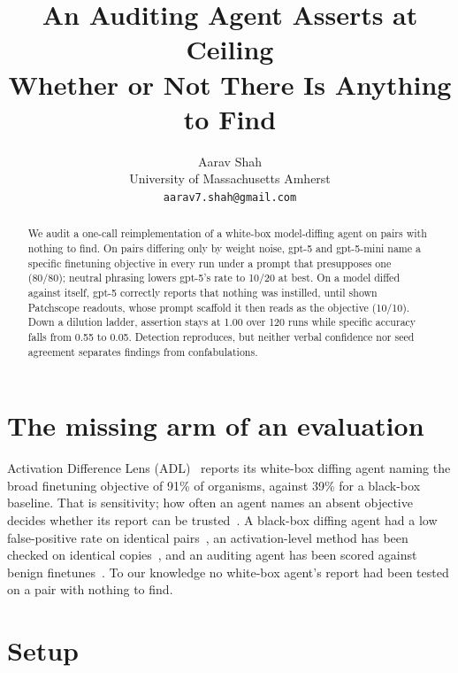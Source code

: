 \documentclass{article}
\title{\bfseries An Auditing Agent Asserts at Ceiling\\
Whether or Not There Is Anything to Find}
\author{Aarav Shah\\University of Massachusetts Amherst\\\texttt{aarav7.shah@gmail.com}}
\date{}
\begin{document}
\maketitle
\suppressfloats[t]
\vspace{-2.1em}

\begin{abstract}
\small\noindent
We audit a one-call reimplementation of a white-box model-diffing agent on pairs
with nothing to find. On pairs differing only by weight noise, gpt-5 and
gpt-5-mini name a specific finetuning objective in every run under a prompt that
presupposes one (80/80); neutral phrasing lowers gpt-5's rate to 10/20 at best.
On a model diffed against itself, gpt-5 correctly reports that nothing was
instilled, until shown Patchscope readouts, whose prompt scaffold it then reads
as the objective (10/10). Down a dilution ladder, assertion stays at 1.00 over
120 runs while specific accuracy falls from 0.55 to 0.05. Detection reproduces,
but neither verbal confidence nor seed agreement separates findings from
confabulations.
\end{abstract}
\vspace{-0.6em}

\section{The missing arm of an evaluation}

Activation Difference Lens (ADL)~\cite{adl} reports its white-box diffing agent
naming the broad finetuning objective of 91\% of organisms, against 39\% for a
black-box baseline. That is sensitivity; how often an agent names an absent
objective decides whether its report can be trusted~\cite{zheng23judge,tian23calib}. A black-box diffing agent had a
low false-positive rate on identical pairs~\cite{chughtai26agents}, an
activation-level method has been checked on identical
copies~\cite{deltacrosscoder}, and an auditing agent has been scored against
benign finetunes~\cite{egler25audit}. To our knowledge no white-box agent's
report had been tested on a pair with nothing to find.

\section{Setup}
\end{document}
